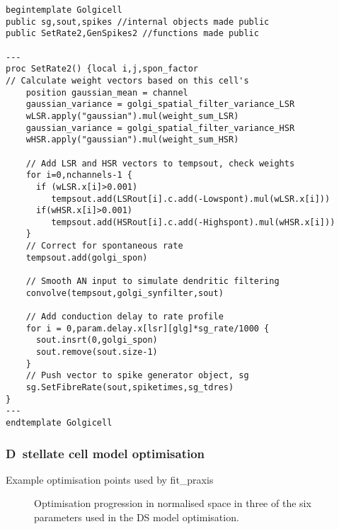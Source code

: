 \begin{lstlisting}[label=lst:GolgiTemplate,caption=Rate-based golgi cell model
  template (in par\_CNcell.tem)]
begintemplate Golgicell
public sg,sout,spikes //internal objects made public
public SetRate2,GenSpikes2 //functions made public

---
proc SetRate2() {local i,j,spon_factor
// Calculate weight vectors based on this cell's
    position gaussian_mean = channel
    gaussian_variance = golgi_spatial_filter_variance_LSR
    wLSR.apply("gaussian").mul(weight_sum_LSR)
    gaussian_variance = golgi_spatial_filter_variance_HSR
    wHSR.apply("gaussian").mul(weight_sum_HSR)

    // Add LSR and HSR vectors to tempsout, check weights
    for i=0,nchannels-1 {
      if (wLSR.x[i]>0.001)
         tempsout.add(LSRout[i].c.add(-Lowspont).mul(wLSR.x[i]))
      if(wHSR.x[i]>0.001)
         tempsout.add(HSRout[i].c.add(-Highspont).mul(wHSR.x[i]))
    }
    // Correct for spontaneous rate
    tempsout.add(golgi_spon)

    // Smooth AN input to simulate dendritic filtering
    convolve(tempsout,golgi_synfilter,sout)

    // Add conduction delay to rate profile
    for i = 0,param.delay.x[lsr][glg]*sg_rate/1000 {
      sout.insrt(0,golgi_spon)
      sout.remove(sout.size-1)
    }
    // Push vector to spike generator object, sg
    sg.SetFibreRate(sout,spiketimes,sg_tdres)
}
---
endtemplate Golgicell

\end{lstlisting}



\subsubsection[D~stellate cell model]{D~stellate cell model optimisation}    \label{sec:APDX:d-stellate-cell}

Example optimisation points used by \textsf{fit\_praxis}
\begin{figure}[htb]
  \centering
  \caption[Parameter searching in PRAXIS]{Optimisation progression in normalised space in three of the six
    parameters used in the DS model optimisation.} \label{fig:praxis}
\end{figure}


